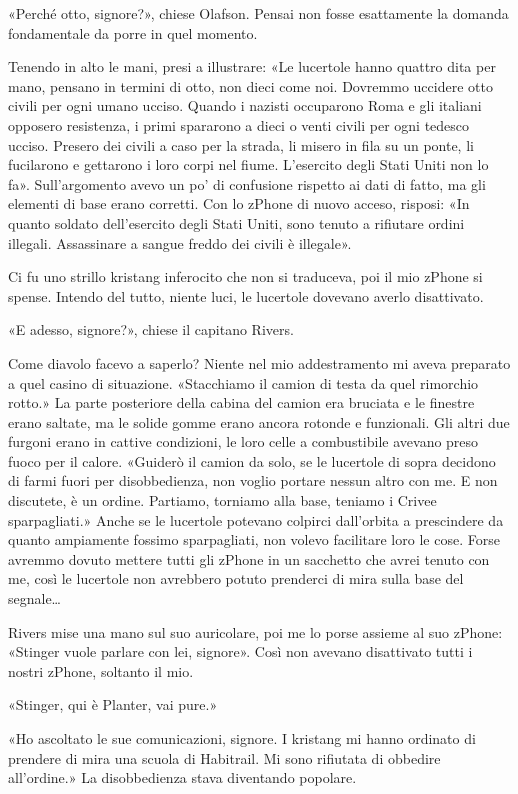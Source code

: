 «Perché otto, signore?», chiese Olafson. Pensai non fosse esattamente la
domanda fondamentale da porre in quel momento.

Tenendo in alto le mani, presi a illustrare: «Le lucertole hanno quattro
dita per mano, pensano in termini di otto, non dieci come noi. Dovremmo
uccidere otto civili per ogni umano ucciso. Quando i nazisti occuparono
Roma e gli italiani opposero resistenza, i primi spararono a dieci o
venti civili per ogni tedesco ucciso. Presero dei civili a caso per la
strada, li misero in fila su un ponte, li fucilarono e gettarono i loro
corpi nel fiume. L'esercito degli Stati Uniti non lo fa». Sull'argomento
avevo un po' di confusione rispetto ai dati di fatto, ma gli elementi di
base erano corretti. Con lo zPhone di nuovo acceso, risposi: «In quanto
soldato dell'esercito degli Stati Uniti, sono tenuto a rifiutare ordini
illegali. Assassinare a sangue freddo dei civili è illegale».

Ci fu uno strillo kristang inferocito che non si traduceva, poi il mio
zPhone si spense. Intendo del tutto, niente luci, le lucertole dovevano
averlo disattivato.

«E adesso, signore?», chiese il capitano Rivers.

Come diavolo facevo a saperlo? Niente nel mio addestramento mi aveva
preparato a quel casino di situazione. «Stacchiamo il camion di testa da
quel rimorchio rotto.» La parte posteriore della cabina del camion era
bruciata e le finestre erano saltate, ma le solide gomme erano ancora
rotonde e funzionali. Gli altri due furgoni erano in cattive condizioni,
le loro celle a combustibile avevano preso fuoco per il calore. «Guiderò
il camion da solo, se le lucertole di sopra decidono di farmi fuori per
disobbedienza, non voglio portare nessun altro con me. E non discutete,
è un ordine. Partiamo, torniamo alla base, teniamo i Crivee
sparpagliati.» Anche se le lucertole potevano colpirci dall'orbita a
prescindere da quanto ampiamente fossimo sparpagliati, non volevo
facilitare loro le cose. Forse avremmo dovuto mettere tutti gli zPhone
in un sacchetto che avrei tenuto con me, così le lucertole non avrebbero
potuto prenderci di mira sulla base del segnale\ldots{}

Rivers mise una mano sul suo auricolare, poi me lo porse assieme al suo
zPhone: «Stinger vuole parlare con lei, signore». Così non avevano
disattivato tutti i nostri zPhone, soltanto il mio.

«Stinger, qui è Planter, vai pure.»

«Ho ascoltato le sue comunicazioni, signore. I kristang mi hanno
ordinato di prendere di mira una scuola di Habitrail. Mi sono rifiutata
di obbedire all'ordine.» La disobbedienza stava diventando popolare.

